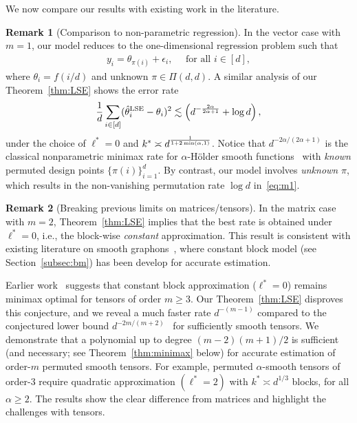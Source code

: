 \documentclass[12pt]{article}
\theoremstyle{definition}
\newtheorem{rmk}{Remark}
\begin{document}
We now compare our results with existing work in the literature.
\begin{rmk}[Comparison to non-parametric regression]
In the vector case with $m = 1$,  our model reduces to the one-dimensional regression problem such that
\begin{align}
    y_i  = \theta_{\pi(i)}+\epsilon_i,  \quad\text{ for all } i\in [d],
\end{align}
where $\theta_i=f(i/d)$ and unknown $\pi \in \Pi(d,d)$.
A similar analysis of our Theorem~\ref{thm:LSE} shows the error rate
\begin{align}\label{eq:m1}
    \frac{1}{d}\sum_{i\in[d]}(\hat\theta_i^{\text{LSE}}-\theta_i)^2 \lesssim \left(d^{-{2\alpha\over 2\alpha+1}}+\log d\right),
\end{align}
under the choice of $\ell^* = 0$ and $k^* \asymp d^{1\over 1+2\min(\alpha,1)}$.
Notice that  $d^{-2\alpha/(2\alpha+1)}$ is the  classical nonparametric minimax rate for $\alpha$-Hölder smooth functions~\citep{tsybakov2009introduction} with \emph{known} permuted design points $\{\pi(i)\}_{i=1}^d$. By contrast, our model involves \emph{unknown} $\pi$, which results in the non-vanishing permutation rate $\log d$ in~\eqref{eq:m1}.
\end{rmk}

\begin{rmk}[Breaking previous limits on matrices/tensors]
In the matrix case with $m=2$, Theorem~\ref{thm:LSE} implies that the best rate is obtained under $\ell^*=0$, i.e., the block-wise \emph{constant} approximation. This result is consistent with existing literature on smooth graphons~\cite{bickel2009nonparametric,gao2015rate,klopp2017oracle}, where constant block model (see Section~\ref{subsec:bm}) has been develop for accurate estimation.

Earlier work~\cite{balasubramanian2021nonparametric} suggests that constant block approximation ($\ell^*=0$) remains minimax optimal for tensors of order $m\geq 3$. Our Theorem~\ref{thm:LSE} disproves this conjecture, and we reveal a much faster rate $d^{-(m-1)}$ compared to the conjectured lower bound $d^{-2m/( m+2)}$~\cite{balasubramanian2021nonparametric} for sufficiently smooth tensors. We demonstrate that a polynomial up to degree $(m-2)(m+1)/2$ is sufficient (and necessary; see Theorem~\ref{thm:minimax} below) for accurate estimation of order-$m$ permuted smooth tensors. 
For example, permuted $\alpha$-smooth tensors of order-3 require quadratic approximation $(\ell^*=2)$ with $k^*\asymp d^{1/3}$ blocks, for all $\alpha\geq 2$. The results show the clear difference from matrices and highlight the challenges with tensors.
\end{rmk}
\end{document}

